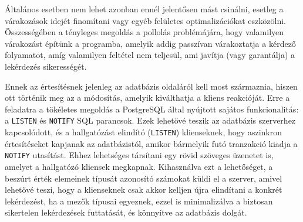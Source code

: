 Általános esetben nem lehet azonban ennél jelentősen mást csinálni, esetleg a várakozások idejét finomítani vagy egyéb felületes optimalizációkat eszközölni.
Összességében a tényleges megoldás a pollolás problémájára, hogy valamilyen várakozást építünk a programba, amelyik addig passzívan várakoztatja a kérdező folyamatot, amíg valamilyen feltétel nem teljesül, ami javítja (vagy garantálja) a lekérdezés sikerességét.

Ennek az értesítésnek jelenleg az adatbázis oldaláról kell most származnia, hiszen ott történik meg az a módosítás, amelyik kiválthatja a kliens reakcióját.
Erre a feladatra a tökéletes megoldás a PostgreSQL által nyújtott sajátos funkcionalitás: a \texttt{LISTEN} és \texttt{NOTIFY} SQL parancsok.
Ezek lehetővé teszik az adatbázis szerverhez kapcsolódott, és a hallgatózást elindító (\texttt{LISTEN}) klienseknek, hogy aszinkron értesítéseket kapjanak az adatbázistól, amikor bármelyik futó tranzakció kiadja a \texttt{NOTIFY} utasítást.
Ehhez lehetséges társítani egy rövid szöveges üzenetet is, amelyet a hallgatózó kliensek megkapnak.
Kihasználva ezt a lehetőséget, a beszúrt \nes{} érték elemeinek típusát azonosító számokat küldi el a szerver, amivel lehetővé teszi, hogy a klienseknek csak akkor kelljen újra elindítani a konkrét lekérdezést, ha a mezők típusai egyeznek, ezzel is minimalizálva a biztosan sikertelen lekérdezések futtatását, és könnyítve az adatbázis dolgát.
















